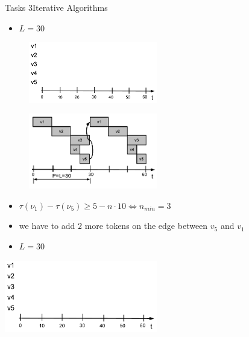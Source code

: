 \begin{frame}[allowframebreaks]{Tasks 3}{Iterative Algorithms}
\begin{solutionnoinc}
\begin{itemize}
\begin{itemize}
          \item $L = 30$
        \end{itemize}
    \end{itemize}
    \begin{figure}
      \centering
      \includegraphics[width=0.5\textwidth]{./figures/task3_empty_schedule.png}
    \end{figure}
  \end{solutionnoinc}
  \framebreak
  \begin{solution}
    \begin{figure}
      \centering
      \includegraphics[width=0.5\textwidth]{./figures/task3_scheduling_result_video_codec.png}
    \end{figure}
  \end{solution}
  \framebreak
  \begin{solutionnoinc}
    \begin{itemize}
      \item $\tau\left(\nu_1\right)-\tau\left(\nu_5\right) \geq 5-n \cdot 10 \Leftrightarrow n_{min} = 3$
      \item we have to add $2$ more tokens on the edge between $v_5$ and $v_1$
      \item $L = 30$
    \end{itemize}
    \centering
    \includegraphics[width=0.5\textwidth]{./figures/task3_empty_schedule.png}
  \end{solutionnoinc}

\end{frame}
